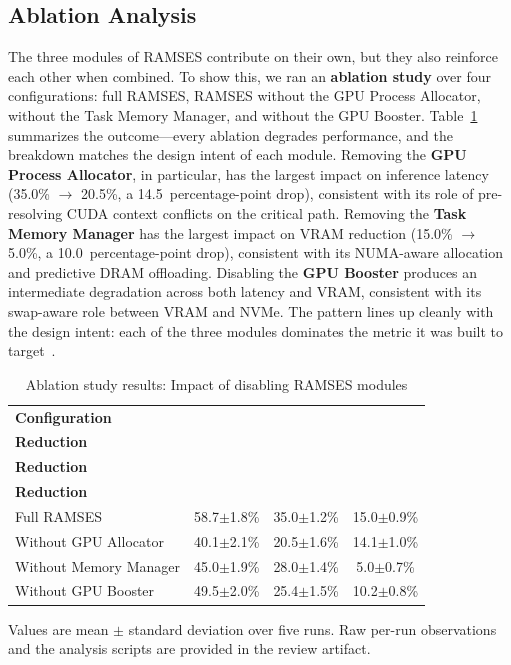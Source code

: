 \subsection{Ablation Analysis}
The three modules of RAMSES contribute on their own, but they also reinforce each other when combined. To show this, we ran an \textbf{ablation study} over four configurations: full RAMSES, RAMSES without the GPU Process Allocator, without the Task Memory Manager, and without the GPU Booster. Table~\ref{tab:ablation} summarizes the outcome---every ablation degrades performance, and the breakdown matches the design intent of each module. Removing the \textbf{GPU Process Allocator}, in particular, has the largest impact on inference latency (35.0\% $\rightarrow$ 20.5\%, a 14.5~percentage-point drop), consistent with its role of pre-resolving CUDA context conflicts on the critical path. Removing the \textbf{Task Memory Manager} has the largest impact on VRAM reduction (15.0\% $\rightarrow$ 5.0\%, a 10.0~percentage-point drop), consistent with its NUMA-aware allocation and predictive DRAM offloading. Disabling the \textbf{GPU Booster} produces an intermediate degradation across both latency and VRAM, consistent with its swap-aware role between VRAM and NVMe. The pattern lines up cleanly with the design intent: each of the three modules dominates the metric it was built to target~\cite{korthikanti2023reducing}.

\begin{table}[h]
\centering
\renewcommand{\arraystretch}{1.1}
\caption{Ablation study results: Impact of disabling RAMSES modules}
\label{tab:ablation}
\begin{tabular}{|l|c|c|c|}
\hline
\textbf{Configuration} &
\makecell{\textbf{Load Time} \\ \textbf{Reduction}} &
\makecell{\textbf{Latency} \\ \textbf{Reduction}} &
\makecell{\textbf{VRAM} \\ \textbf{Reduction}} \\
\hline
Full RAMSES             & 58.7$\pm$1.8\% & 35.0$\pm$1.2\% & 15.0$\pm$0.9\% \\
Without GPU Allocator  & 40.1$\pm$2.1\% & 20.5$\pm$1.6\% & 14.1$\pm$1.0\% \\
Without Memory Manager & 45.0$\pm$1.9\% & 28.0$\pm$1.4\% & 5.0$\pm$0.7\%  \\
Without GPU Booster    & 49.5$\pm$2.0\% & 25.4$\pm$1.5\% & 10.2$\pm$0.8\% \\
\hline
\end{tabular}
\vspace{0.3ex}
{\footnotesize Values are mean $\pm$ standard deviation over five runs. Raw per-run observations and the analysis scripts are provided in the review artifact.}
\end{table}

